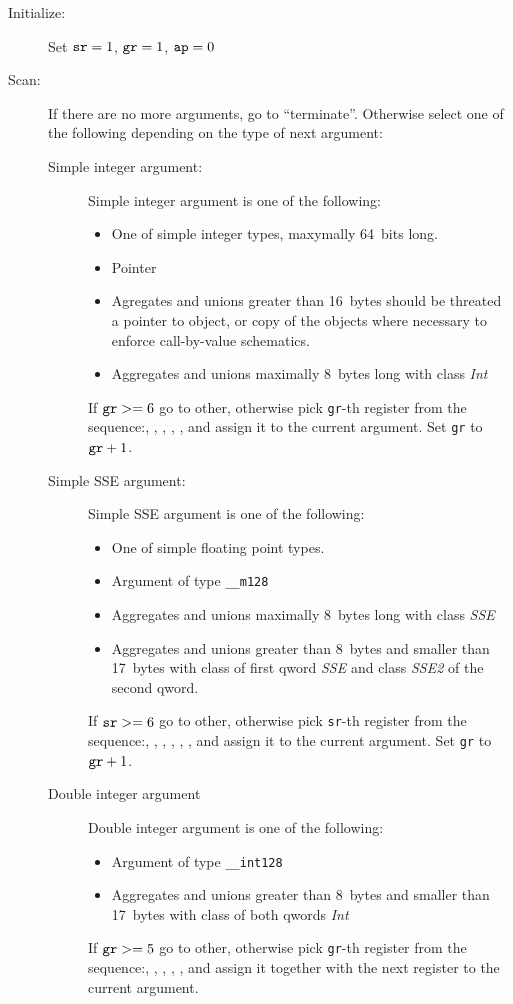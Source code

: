 \begin{description}
\item[Initialize:]
Set $\verb|sr|=1$, $\verb|gr|=1$, $\verb|ap|=0$


\item[Scan:]
If there are no more arguments, go to ``terminate''. Otherwise select one of the
following depending on the type of next argument:
\begin{description}
\item[Simple integer argument:]
Simple integer argument is one of the following:
\begin{itemize}
\item One of simple integer types, maxymally 64~bits long.
\item Pointer
\item Agregates and unions greater than 16~bytes should be threated a
pointer to object, or copy of the objects where necessary to enforce
call-by-value schematics.
\item Aggregates and unions maximally 8~bytes long with class \emph{Int}
\end{itemize}
If $\verb|gr| >= 6$ go to other, otherwise pick \verb|gr|-th register from
the sequence:\RAX, \RDX, \RCX, \RBX, \RSI, \RDI and assign it to the current
argument. Set \verb|gr| to $\verb|gr|+1$.


\item[Simple SSE argument:]
Simple SSE argument is one of the following:
\begin{itemize}
\item One of simple floating point types.
\item Argument of type \verb|__m128|
\item Aggregates and unions maximally 8~bytes long with class \emph{SSE}
\item Aggregates and unions greater than 8~bytes and smaller than 17~bytes with class of first qword \emph{SSE}
and class \emph{SSE2} of the second qword.
\end{itemize}
If $\verb|sr| >= 6$ go to other, otherwise pick \verb|sr|-th register from
the sequence:, , , , , , 
and assign it to the current argument.
Set \verb|gr| to $\verb|gr|+1$.

\item[Double integer argument]
Double integer argument is one of the following:
\begin{itemize}
\item Argument of type \verb|__int128|
\item Aggregates and unions greater than 8~bytes and smaller than 17~bytes with class of both qwords \emph{Int}
\end{itemize}
If $\verb|gr| >= 5$ go to other, otherwise pick \verb|gr|-th register from
the sequence:\RAX, \RDX, \RCX, \RBX, \RSI, \RDI and assign it together with the
next register to the current argument.


\end{description}
\end{description}
